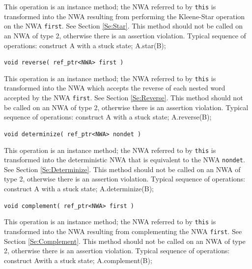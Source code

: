 \begin{description}
    This operation is an instance method; the NWA referred to by
    \texttt{this} is transformed into the NWA resulting from performing the
    Kleene-Star operation on the NWA \texttt{first}.  See Section
    \ref{Se:Star}.  This method should not be called on an NWA of type 2,
    otherwise there is an assertion violation.  Typical sequence of
    operations: construct A with a stuck state; A.star(B);

  \item\texttt{void reverse( ref\_ptr<NWA> first )} \nopagebreak

    This operation is an instance method; the NWA referred to by
    \texttt{this} is transformed into the NWA which accepts the reverse of
    each nested word accepted by the NWA \texttt{first}.  See Section
    \ref{Se:Reverse}.  This method should not be called on an NWA of type 2,
    otherwise there is an assertion violation.  Typical sequence of
    operations: construct A with a stuck state; A.reverse(B);

  \item\texttt{void determinize( ref\_ptr<NWA> nondet )} \nopagebreak

    This operation is an instance method; the NWA referred to by
    \texttt{this} is transformed into the deterministic NWA that is
    equivalent to the NWA \texttt{nondet}.  See Section \ref{Se:Determinize}.
    This method should not be called on an NWA of type 2, otherwise there is
    an assertion violation.  Typical sequence of operations: construct A with
    a stuck state; A.determinize(B);

  \item\texttt{void complement( ref\_ptr<NWA> first )} \nopagebreak

    This operation is an instance method; the NWA referred to by
    \texttt{this} is transformed into the NWA resulting from complementing
    the NWA \texttt{first}.  See Section \ref{Se:Complement}.  This method
    should not be called on an NWA of type 2, otherwise there is an assertion
    violation.  Typical sequence of operations: construct Awith a stuck
    state; A.complement(B);

\end{description}

